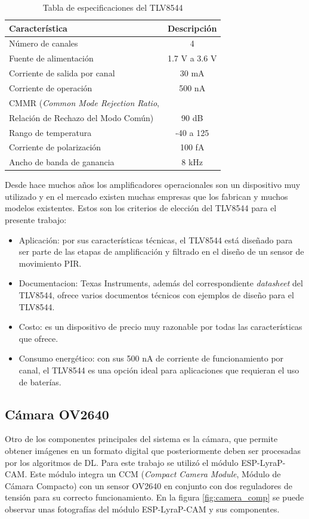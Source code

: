 \begin{table}[h]
	\centering
	\caption[TLV8544 especificaciones]{Tabla de especificaciones del TLV8544 \cite{opamp_info}}
	\begin{tabular}{lc}   
		\toprule
		\textbf{Característica} 	 & \textbf{Descripción}  \\
		\midrule
		Número de canales & 4 \\
		Fuente de alimentación & 1.7 V a 3.6 V \\
		Corriente de salida por canal & 30 mA \\
		Corriente de operación & 500 nA \\
		CMMR (\textit{Common Mode Rejection Ratio}, \\ Relación de Rechazo del Modo Común) & 90 dB \\
		Rango de temperatura & -40 \textcelsius  a 125 \textcelsius\\
		Corriente de polarización & 100 fA \\
		Ancho de banda de ganancia & 8 kHz \\
		\bottomrule
		\hline
	\end{tabular}
	\label{tab:opamp_specs}
\end{table}

Desde hace muchos años los amplificadores operacionales son un dispositivo muy utilizado y en el mercado existen muchas empresas que los fabrican y muchos modelos existentes. Estos son los criterios de elección del TLV8544 para el presente trabajo:
\begin{itemize}
	\item Aplicación: por sus características técnicas, el TLV8544 está diseñado para ser parte de las etapas de amplificación y filtrado en el diseño de un sensor de movimiento PIR.
	\item Documentacion: Texas Instruments, además del correspondiente \textit{datasheet} del TLV8544, ofrece varios documentos técnicos con ejemplos de diseño para el TLV8544.
	\item Costo: es un dispositivo de precio muy razonable por todas las características que ofrece.
	\item Consumo energético: con sus 500 nA de corriente de funcionamiento por canal, el TLV8544 es una opción ideal para aplicaciones que requieran el uso de baterías.
\end{itemize}

\subsection{Cámara OV2640}
Otro de los componentes principales del sistema es la cámara, que permite obtener imágenes en un formato digital que posteriormente deben ser procesadas por los algoritmos de DL. Para este trabajo se utilizó el módulo ESP-LyraP-CAM. Este módulo integra un CCM (\textit{Compact Camera Module}, Módulo de Cámara Compacto) con un sensor OV2640 en conjunto con dos reguladores de tensión para su correcto funcionamiento. En la figura \ref{fig:camera_comp} se puede observar unas fotografías del módulo ESP-LyraP-CAM y sus componentes.

